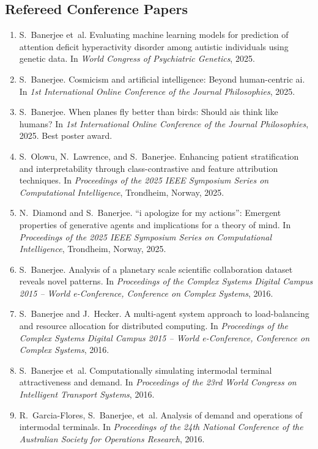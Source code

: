 \documentclass[11pt,a4paper]{article}
\begin{document}
\subsection*{Refereed Conference Papers}
\begin{enumerate}
  \item S.~Banerjee et~al. Evaluating machine learning models for prediction of attention deficit hyperactivity disorder among autistic individuals using genetic data. In {\em World Congress of Psychiatric Genetics}, 2025.
  \item S.~Banerjee. Cosmicism and artificial intelligence: Beyond human-centric ai. In {\em 1st International Online Conference of the Journal Philosophies}, 2025.
  \item S.~Banerjee. When planes fly better than birds: Should ais think like humans? In {\em 1st International Online Conference of the Journal Philosophies}, 2025. Best poster award.
  \item S.~Olowu, N.~Lawrence, and S.~Banerjee. Enhancing patient stratification and interpretability through class-contrastive and feature attribution techniques. In {\em Proceedings of the 2025 IEEE Symposium Series on Computational Intelligence}, Trondheim, Norway, 2025.
  \item N.~Diamond and S.~Banerjee. ``i apologize for my actions'': Emergent properties of generative agents and implications for a theory of mind. In {\em Proceedings of the 2025 IEEE Symposium Series on Computational Intelligence}, Trondheim, Norway, 2025.
  \item S.~Banerjee. Analysis of a planetary scale scientific collaboration dataset reveals novel patterns. In {\em Proceedings of the Complex Systems Digital Campus 2015 -- World e-Conference, Conference on Complex Systems}, 2016.
  \item S.~Banerjee and J.~Hecker. A multi-agent system approach to load-balancing and resource allocation for distributed computing. In {\em Proceedings of the Complex Systems Digital Campus 2015 -- World e-Conference, Conference on Complex Systems}, 2016.
  \item S.~Banerjee et~al. Computationally simulating intermodal terminal attractiveness and demand. In {\em Proceedings of the 23rd World Congress on Intelligent Transport Systems}, 2016.
  \item R.~Garcia-Flores, S.~Banerjee, et~al. Analysis of demand and operations of intermodal terminals. In {\em Proceedings of the 24th National Conference of the Australian Society for Operations Research}, 2016.

\end{enumerate}
\end{document}
